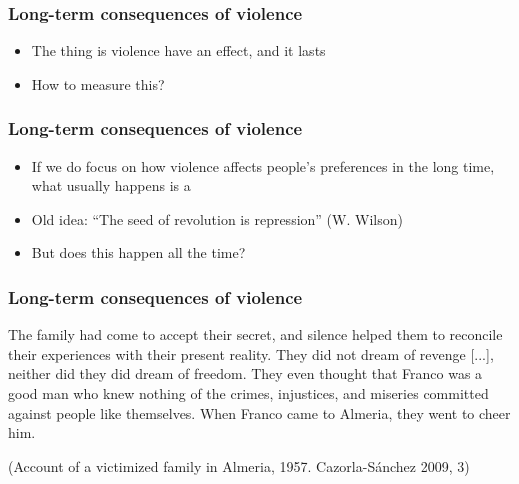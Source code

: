 \documentclass[aspectratio=43]{beamer}
\begin{document}
\begin{frame}
\frametitle{Long-term consequences of violence}
\centering

\begin{itemize}[<+->]
  \item The thing is violence {\color{red}{does}} have an effect, and it lasts
  \item How to measure this?
\end{itemize}

\end{frame}

\begin{frame}
\frametitle{Long-term consequences of violence}
\centering

\begin{itemize}[<+->]
  \item If we do focus on how violence affects people's preferences in the long time, what usually happens is a {\color{red}{backfiring effect}}
  \item Old idea: ``The seed of revolution is repression'' (W. Wilson)
  \item But does this happen all the time?
\end{itemize}

\end{frame}

\begin{frame}
\frametitle{Long-term consequences of violence}
\centering

{\small The family had come to accept their secret, and silence helped them to reconcile their experiences with their present reality. They did not dream of revenge [...], neither did they did dream of freedom. {\color{red} They even thought that Franco was a good man who knew nothing of the crimes, injustices, and miseries committed against people like themselves.} When Franco came to Almeria, they went to cheer him.}

{\scriptsize (Account of a victimized family in Almeria, 1957. Cazorla-Sánchez 2009, 3)}\\

\end{frame}

\end{document}
